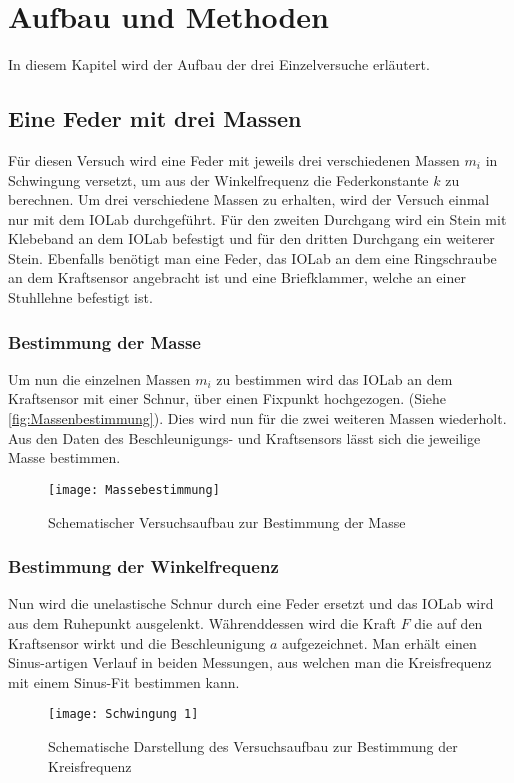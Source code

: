 
\chapter{Aufbau und Methoden}
\label{sec:aufbau}
In diesem Kapitel wird der Aufbau der drei Einzelversuche erläutert.
\section{Eine Feder mit drei Massen}
Für diesen Versuch wird eine Feder mit jeweils drei verschiedenen Massen $m_i$ in Schwingung versetzt, um aus der Winkelfrequenz die Federkonstante $k$ zu berechnen. Um drei verschiedene Massen zu erhalten, wird der Versuch einmal nur mit dem IOLab durchgeführt. Für den zweiten Durchgang wird ein Stein mit Klebeband an dem IOLab befestigt und für den dritten Durchgang ein weiterer Stein. Ebenfalls benötigt man eine Feder, das IOLab an dem eine Ringschraube an dem Kraftsensor angebracht ist und eine Briefklammer, welche an einer Stuhllehne befestigt ist.
\subsection{Bestimmung der Masse}
Um nun die einzelnen Massen $m_i$ zu bestimmen wird das IOLab an dem Kraftsensor mit einer Schnur, über einen Fixpunkt hochgezogen. (Siehe \autoref{fig:Massenbestimmung}). Dies wird nun für die zwei weiteren Massen wiederholt. Aus den Daten des Beschleunigungs- und Kraftsensors lässt sich die jeweilige Masse bestimmen. 
\begin{figure}[H]
	\centering
	\texttt{[image: Massebestimmung]}
	\caption[Versuchsaufbau der Massebestimmung]{Schematischer Versuchsaufbau zur Bestimmung der Masse}
	\label{fig:Massenbestimmung}
\end{figure}
\subsection{Bestimmung der Winkelfrequenz}
Nun wird die unelastische Schnur durch eine Feder ersetzt und das IOLab wird aus dem Ruhepunkt ausgelenkt. Währenddessen wird die Kraft $F$ die auf den Kraftsensor wirkt und die Beschleunigung $a$ aufgezeichnet. Man erhält einen Sinus-artigen Verlauf in beiden Messungen, aus welchen man die Kreisfrequenz mit einem Sinus-Fit bestimmen kann.
\begin{figure}[H]
	\centering
	\texttt{[image: Schwingung 1]}
	\caption[Versuchsaufbau für eine Feder]{Schematische Darstellung des Versuchsaufbau zur Bestimmung der Kreisfrequenz}
	\label{fig:Schwingungsperiode1}
\end{figure}
